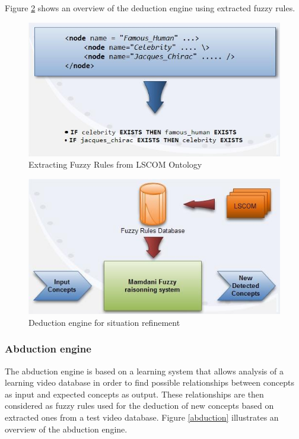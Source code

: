 		Figure \ref{deduction} shows an overview of the deduction engine using extracted fuzzy rules.
		\begin{figure}[h]
			\centering
			\includegraphics[scale=0.45]{graphics/contrib1::lscom_example}
			\caption{Extracting Fuzzy Rules from LSCOM Ontology}
			\label{lscom}
		\end{figure}

		\begin{figure}[h]
			\centering
			\includegraphics[scale=0.45]{graphics/contrib1::deduction}
			\caption{Deduction engine for situation refinement}
			\label{deduction}
		\end{figure}
		
		\subsubsection{Abduction engine}
		The abduction engine is based on a learning system that allows analysis of a  learning video database 
		in order to find possible relationships between concepts as input and expected concepts as output.
		These relationships are then considered  as fuzzy rules used for the deduction of new concepts based 
		on extracted ones from a test video database. Figure \ref{abduction} illustrates an overview of the abduction 
		engine.

